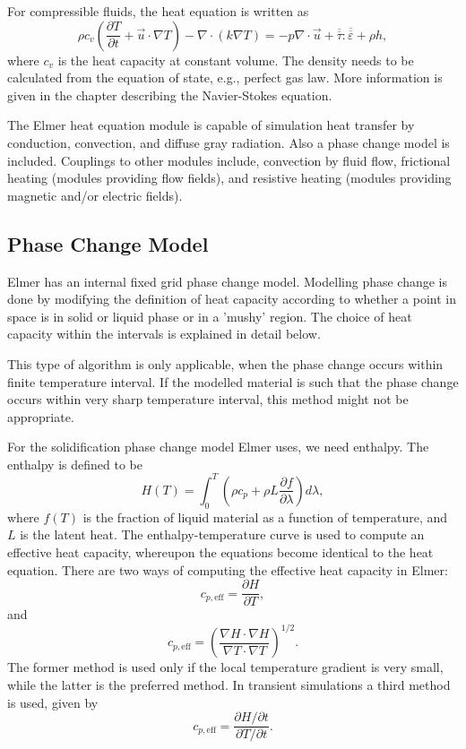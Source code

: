 For compressible fluids, the heat equation is written as
\begin{equation}
\rho c_v\left(\frac{\partial T}{\partial t} + \vec{u}\cdot\nabla T\right) -
\nabla\cdot\left(k\nabla T\right) = - p \nabla\cdot\vec{u} 
+ \overline{\overline\tau}:\overline{\overline \varepsilon}
+ \rho h,
\end{equation}
where $c_v$ is the heat capacity at constant volume. The density needs to be
calculated from the equation of state, e.g., perfect gas law. More
information is given in the chapter describing the Navier-Stokes equation.

The Elmer heat equation module is capable of simulation heat transfer by
conduction, convection, and diffuse gray radiation. Also a phase change
model is included. Couplings to other modules include, convection by
fluid flow, frictional heating (modules providing flow fields), and
resistive heating (modules providing magnetic and/or electric fields).


\subsection{Phase Change Model}

Elmer has an internal fixed grid phase change model. Modelling phase change is done
by modifying the definition of heat capacity according to whether
a point in space is in solid or liquid phase or in a 'mushy' region.
The choice of heat capacity within the intervals is explained in detail
below.

This type of algorithm is only applicable, when the phase change occurs
within finite temperature interval. If the modelled material is such that
the phase change occurs within very sharp temperature interval, this
method might not be appropriate.

For the solidification phase change model Elmer uses,  we need enthalpy.
The enthalpy is defined to be
\begin{equation}
H(T) = \int_0^T \left ( \rho c_p + \rho L\frac{\partial f}{\partial \lambda}\right )d\lambda,
\end{equation}
where $f(T)$ is the fraction of liquid material as a function of
temperature, and $L$ is the latent heat.
The enthalpy-temperature curve is used
to compute an effective heat capacity, whereupon the equations become identical
to the heat equation. There are two ways of computing the effective heat capacity in Elmer:
\begin{equation}
c_{p,\mathrm{eff}} = \frac{\partial H}{\partial T},
\end{equation}
and
\begin{equation}
c_{p,\mathrm{eff}} = \left ( \frac{\nabla H\cdot\nabla H}{\nabla T\cdot\nabla T}\right )^{1/2}.
\end{equation}
The former method is used only if the local temperature gradient is very small, while
the latter is the preferred method. In transient simulations a third method is used, given
by
\begin{equation}
c_{p,\mathrm{eff}} = \frac{\partial H/\partial t}{\partial T/\partial t}.
\end{equation}

